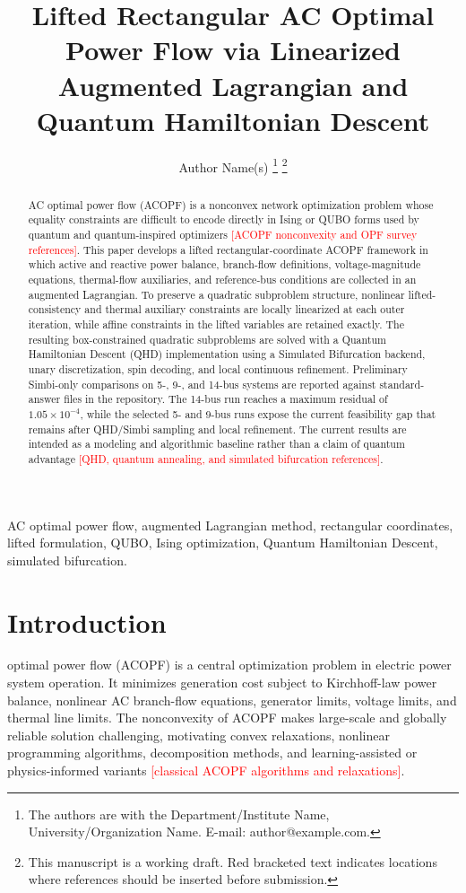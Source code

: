 \documentclass[journal]{IEEEtran}
\title{Lifted Rectangular AC Optimal Power Flow via Linearized Augmented Lagrangian and Quantum Hamiltonian Descent}
\author{Author Name(s)
\thanks{The authors are with the Department/Institute Name, University/Organization Name. E-mail: author@example.com.}
\thanks{This manuscript is a working draft. Red bracketed text indicates locations where references should be inserted before submission.}}
\newcommand{\needref}[1]{\textcolor{red}{[#1]}}
\begin{document}
\maketitle

\begin{abstract}
AC optimal power flow (ACOPF) is a nonconvex network optimization problem whose equality constraints are difficult to encode directly in Ising or QUBO forms used by quantum and quantum-inspired optimizers \needref{ACOPF nonconvexity and OPF survey references}. This paper develops a lifted rectangular-coordinate ACOPF framework in which active and reactive power balance, branch-flow definitions, voltage-magnitude equations, thermal-flow auxiliaries, and reference-bus conditions are collected in an augmented Lagrangian. To preserve a quadratic subproblem structure, nonlinear lifted-consistency and thermal auxiliary constraints are locally linearized at each outer iteration, while affine constraints in the lifted variables are retained exactly. The resulting box-constrained quadratic subproblems are solved with a Quantum Hamiltonian Descent (QHD) implementation using a Simulated Bifurcation backend, unary discretization, spin decoding, and local continuous refinement. Preliminary Simbi-only comparisons on 5-, 9-, and 14-bus systems are reported against standard-answer files in the repository. The 14-bus run reaches a maximum residual of $1.05\times 10^{-4}$, while the selected 5- and 9-bus runs expose the current feasibility gap that remains after QHD/Simbi sampling and local refinement. The current results are intended as a modeling and algorithmic baseline rather than a claim of quantum advantage \needref{QHD, quantum annealing, and simulated bifurcation references}.
\end{abstract}

\begin{IEEEkeywords}
AC optimal power flow, augmented Lagrangian method, rectangular coordinates, lifted formulation, QUBO, Ising optimization, Quantum Hamiltonian Descent, simulated bifurcation.
\end{IEEEkeywords}

\section{Introduction}
 optimal power flow (ACOPF) is a central optimization problem in electric power system operation. It minimizes generation cost subject to Kirchhoff-law power balance, nonlinear AC branch-flow equations, generator limits, voltage limits, and thermal line limits. The nonconvexity of ACOPF makes large-scale and globally reliable solution challenging, motivating convex relaxations, nonlinear programming algorithms, decomposition methods, and learning-assisted or physics-informed variants \needref{classical ACOPF algorithms and relaxations}.
\end{document}
